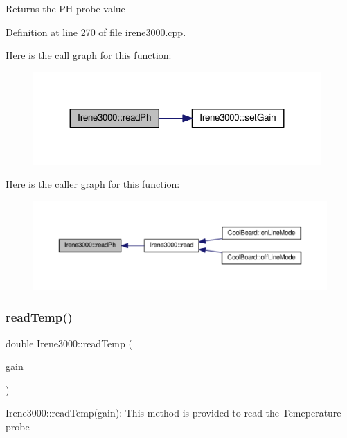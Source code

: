 \begin{DoxyReturn}{Returns}
the PH probe value 
\end{DoxyReturn}


Definition at line 270 of file irene3000.\+cpp.

Here is the call graph for this function\+:
\nopagebreak
\begin{figure}[H]
\begin{center}
\leavevmode
\includegraphics[width=311pt]{d6/d03/class_irene3000_abf3db725fabb0634ec889b32068a5eec_cgraph}
\end{center}
\end{figure}
Here is the caller graph for this function\+:
\nopagebreak
\begin{figure}[H]
\begin{center}
\leavevmode
\includegraphics[width=350pt]{d6/d03/class_irene3000_abf3db725fabb0634ec889b32068a5eec_icgraph}
\end{center}
\end{figure}
\mbox{\label{class_irene3000_a94ad40f281d83ad1be20bf1edd6fe802}} 
\subsubsection{\texorpdfstring{read\+Temp()}{readTemp()}}
{\footnotesize\ttfamily double Irene3000\+::read\+Temp (\begin{DoxyParamCaption}\item[{ads\+Gain\+\_\+t}]{gain }\end{DoxyParamCaption})}

Irene3000\+::read\+Temp(gain)\+: This method is provided to read the Temeperature probe

